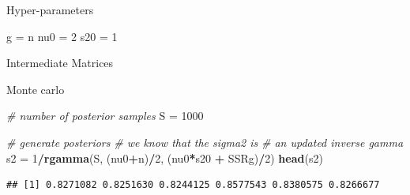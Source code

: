 \documentclass[ignorenonframetext,]{beamer}
\newenvironment{Shaded}{\begin{snugshade}}{\end{snugshade}}
\newcommand{\KeywordTok}[1]{\textcolor[rgb]{0.13,0.29,0.53}{\textbf{#1}}}
\newcommand{\DataTypeTok}[1]{\textcolor[rgb]{0.13,0.29,0.53}{#1}}
\newcommand{\DecValTok}[1]{\textcolor[rgb]{0.00,0.00,0.81}{#1}}
\newcommand{\StringTok}[1]{\textcolor[rgb]{0.31,0.60,0.02}{#1}}
\newcommand{\CommentTok}[1]{\textcolor[rgb]{0.56,0.35,0.01}{\textit{#1}}}
\newcommand{\OperatorTok}[1]{\textcolor[rgb]{0.81,0.36,0.00}{\textbf{#1}}}
\newcommand{\NormalTok}[1]{#1}
\begin{document}
\begin{frame}[fragile]{Hyper-parameters}

\begin{Shaded}
\begin{Highlighting}[]
\NormalTok{g =}\StringTok{ }\NormalTok{n}
\NormalTok{nu0 =}\StringTok{ }\DecValTok{2}
\NormalTok{s20 =}\StringTok{ }\DecValTok{1}
\end{Highlighting}
\end{Shaded}

\end{frame}

\begin{frame}[fragile]{Intermediate Matrices}

\begin{Shaded}
\end{Shaded}

\end{frame}

\begin{frame}[fragile]{Monte carlo}

\begin{Shaded}
\begin{Highlighting}[]
\CommentTok{# number of posterior samples}
\NormalTok{S =}\StringTok{ }\DecValTok{1000}

\CommentTok{# generate posteriors}
\CommentTok{# we know that the sigma2 is}
\CommentTok{# an updated inverse gamma}
\NormalTok{s2 =}\StringTok{ }\DecValTok{1}\OperatorTok{/}\KeywordTok{rgamma}\NormalTok{(S, (nu0}\OperatorTok{+}\NormalTok{n)}\OperatorTok{/}\DecValTok{2}\NormalTok{, (nu0}\OperatorTok{*}\NormalTok{s20 }\OperatorTok{+}\StringTok{ }\NormalTok{SSRg)}\OperatorTok{/}\DecValTok{2}\NormalTok{)}
\KeywordTok{head}\NormalTok{(s2)}
\end{Highlighting}
\end{Shaded}

\begin{verbatim}
## [1] 0.8271082 0.8251630 0.8244125 0.8577543 0.8380575 0.8266677
\end{verbatim}

\end{frame}
\end{document}
